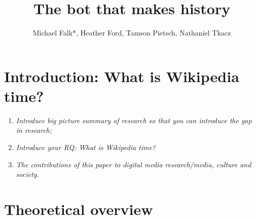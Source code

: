 \documentclass[Royal,times,sageh]{sagej}
\providecommand{\tightlist}{%
  \setlength{\itemsep}{0pt}\setlength{\parskip}{0pt}}
\begin{document}

\title{The bot that makes history}


\author{Michael Falk*, Heather Ford, Tamson
Pietsch, Nathaniel Tkacz}






\maketitle

\hypertarget{introduction-what-is-wikipedia-time}{%
\section{Introduction: What is Wikipedia
time?}\label{introduction-what-is-wikipedia-time}}

\begin{enumerate}
\def\labelenumi{\alph{enumi}.}
\tightlist
\item
  \emph{Introduce big picture summary of research so that you can
  introduce the gap in research;}
\item
  \emph{Introduce your RQ: What is Wikipedia time?}
\item
  \emph{The contributions of this paper to digital media research/media,
  culture and society.}
\end{enumerate}

\hypertarget{theoretical-overview}{%
\section{Theoretical overview}\label{theoretical-overview}}
\end{document}
